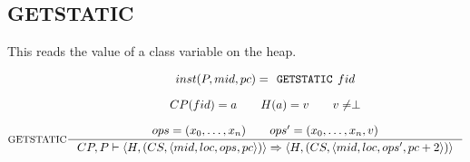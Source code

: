 \subsection{GETSTATIC}
This reads the value of a class variable on the heap.

$$\inference[GETSTATIC]{  
inst(P, mid, pc) = \texttt{GETSTATIC }fid\semnl \\
CP(fid) = a \semsp 
H(a) = v \semsp 
v \neq \perp \semnl \\
ops = (x_0, \ldots, x_n) \semsp 
ops' = (x_0, \ldots, x_n, v) 
}
{CP, P \vdash \langle H, (CS, \langle  mid, loc, ops, pc \rangle)\rangle \Rightarrow \langle H, (CS, \langle mid, loc, ops', pc+2 \rangle)\rangle}$$


